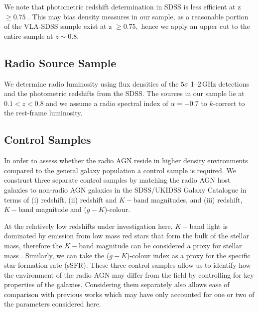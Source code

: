 We note that photometric redshift determination in SDSS is less efficient at z $\geq 0.75$ \citep{reis2012}. This may bias density measures in our sample, as a reasonable portion of the VLA-SDSS sample exist at z $\geq 0.75,$ hence we apply an upper cut to the entire sample at $z\sim0.8.$

\subsection{Radio Source Sample}\label{section:agn-samp}
We determine radio luminosity using flux densities of the $5\sigma$ 1--2\,GHz detections and the photometric redshifts from the SDSS. The sources in our sample lie at $0.1 < z < 0.8$ and we assume a radio spectral index of $\alpha = -0.7$ \citep{condon2002,sadler2002} to $k$-correct to the rest-frame luminosity. 

\subsection{Control Samples}\label{section:control-samp}

In order to assess whether the radio AGN reside in higher density environments compared to the general galaxy population a control sample is required. We construct three separate control samples by matching the radio AGN host galaxies to non-radio AGN galaxies in the SDSS/UKIDSS Galaxy Catalogue in terms of (i) redshift, (ii) redshift and $K-$band magnitudes, and (iii) redshift, $K-$band magnitude and ($g-K$)-colour.

At the relatively low redshifts under investigation here, $K-$band light
is dominated by emission from low mass red stars that form the bulk of the stellar mass, therefore the $K-$band magnitude can be considered a proxy for stellar mass \citep[e.g.][]{gavazzi1996,rocca-volmerange2004}. Similarly, we can take the ($g-K$)-colour index as a proxy for the specific star formation rate (sSFR). These three control samples allow us to identify how the environment of the radio AGN may differ from the field by controlling for key properties of the galaxies. Considering them separately also allows ease of comparison with previous works which may have only accounted for one or two of the parameters considered here.

